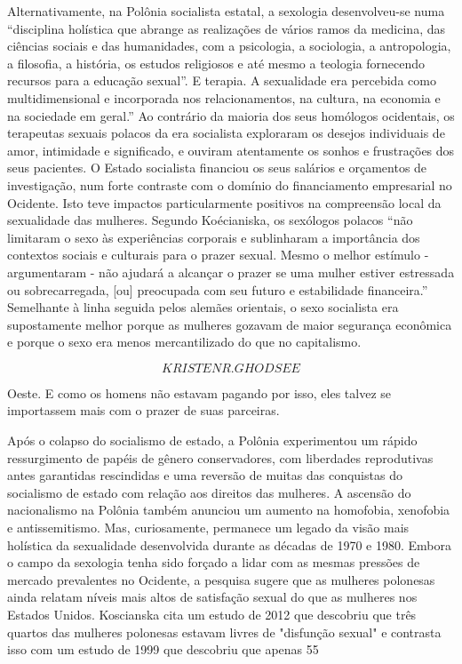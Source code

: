 Alternativamente, na Polônia socialista estatal, a sexologia desenvolveu-se numa “disciplina holística que abrange as realizações de vários ramos da medicina, das ciências sociais e das humanidades, com a psicologia, a sociologia, a antropologia, a filosofia, a história, os estudos religiosos e até mesmo a teologia fornecendo recursos para a educação sexual”. E terapia. A sexualidade era percebida como multidimensional e incorporada nos relacionamentos, na cultura, na economia e na sociedade em geral.” Ao contrário da maioria dos seus homólogos ocidentais, os terapeutas sexuais polacos da era socialista exploraram os desejos individuais de amor, intimidade e significado, e ouviram atentamente os sonhos e frustrações dos seus pacientes. O Estado socialista financiou os seus salários e orçamentos de investigação, num forte contraste com o domínio do financiamento empresarial no Ocidente. Isto teve impactos particularmente positivos na compreensão local da sexualidade das mulheres. Segundo Koécianiska, os sexólogos polacos “não limitaram o sexo às experiências corporais e sublinharam a importância dos contextos sociais e culturais para o prazer sexual. Mesmo o melhor estímulo - argumentaram - não ajudará a alcançar o prazer se uma mulher estiver estressada ou sobrecarregada, [ou] preocupada com seu futuro e estabilidade financeira.” Semelhante à linha seguida pelos alemães orientais, o sexo socialista era supostamente melhor porque as mulheres gozavam de maior segurança econômica e porque o sexo era menos mercantilizado do que no capitalismo.
 \par 
\[KRISTEN R. GHODSEE\]
 \par 
Oeste. E como os homens não estavam pagando por isso, eles talvez se importassem mais com o prazer de suas parceiras.
 \par 
Após o colapso do socialismo de estado, a Polônia experimentou um rápido ressurgimento de papéis de gênero conservadores, com liberdades reprodutivas antes garantidas rescindidas e uma reversão de muitas das conquistas do socialismo de estado com relação aos direitos das mulheres. A ascensão do nacionalismo na Polônia também anunciou um aumento na homofobia, xenofobia e antissemitismo. Mas, curiosamente, permanece um legado da visão mais holística da sexualidade desenvolvida durante as décadas de 1970 e 1980. Embora o campo da sexologia tenha sido forçado a lidar com as mesmas pressões de mercado prevalentes no Ocidente, a pesquisa sugere que as mulheres polonesas ainda relatam níveis mais altos de satisfação sexual do que as mulheres nos Estados Unidos. Koscianska cita um estudo de 2012 que descobriu que três quartos das mulheres polonesas estavam livres de "disfunção sexual" e contrasta isso com um estudo de 1999 que descobriu que apenas 55%
